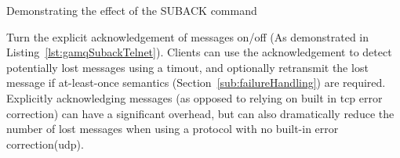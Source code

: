 \begin{listing}[H]
  \centering
  \inputminted{bash}{code/gamqSetackOutput}
  \caption{Demonstrating the effect of the SUBACK command}
  \label{lst:gamqSubackTelnet}
\end{listing}

Turn the explicit acknowledgement of messages on/off (As demonstrated in
Listing~\ref{lst:gamqSubackTelnet}). Clients can use the acknowledgement to
detect potentially lost messages using a timout, and optionally retransmit the
lost message if at-least-once semantics (Section~\ref{sub:failureHandling}) are
required. Explicitly acknowledging messages (as opposed to relying on built in
\gls{tcp} error correction) can have a significant overhead, but can also
dramatically reduce the number of lost messages when using a protocol with no
built-in error correction(\gls{udp}).
